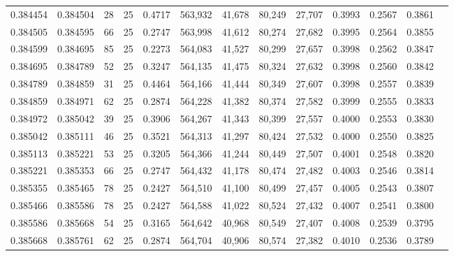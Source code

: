 \begin{tabular}{rrrrrrrrrrrrr}
0.384454 & 0.384504 &    28 &  25 &                                     0.4717 & 563,932 &  41,678 &  80,249 &  27,707 & 0.3993 & 0.2567 & 0.3861 \\
0.384505 & 0.384595 &    66 &  25 &                                     0.2747 & 563,998 &  41,612 &  80,274 &  27,682 & 0.3995 & 0.2564 & 0.3855 \\
0.384599 & 0.384695 &    85 &  25 &                                     0.2273 & 564,083 &  41,527 &  80,299 &  27,657 & 0.3998 & 0.2562 & 0.3847 \\
0.384695 & 0.384789 &    52 &  25 &                                     0.3247 & 564,135 &  41,475 &  80,324 &  27,632 & 0.3998 & 0.2560 & 0.3842 \\
0.384789 & 0.384859 &    31 &  25 &                                     0.4464 & 564,166 &  41,444 &  80,349 &  27,607 & 0.3998 & 0.2557 & 0.3839 \\
0.384859 & 0.384971 &    62 &  25 &                                     0.2874 & 564,228 &  41,382 &  80,374 &  27,582 & 0.3999 & 0.2555 & 0.3833 \\
0.384972 & 0.385042 &    39 &  25 &                                     0.3906 & 564,267 &  41,343 &  80,399 &  27,557 & 0.4000 & 0.2553 & 0.3830 \\
0.385042 & 0.385111 &    46 &  25 &                                     0.3521 & 564,313 &  41,297 &  80,424 &  27,532 & 0.4000 & 0.2550 & 0.3825 \\
0.385113 & 0.385221 &    53 &  25 &                                     0.3205 & 564,366 &  41,244 &  80,449 &  27,507 & 0.4001 & 0.2548 & 0.3820 \\
0.385221 & 0.385353 &    66 &  25 &                                     0.2747 & 564,432 &  41,178 &  80,474 &  27,482 & 0.4003 & 0.2546 & 0.3814 \\
0.385355 & 0.385465 &    78 &  25 &                                     0.2427 & 564,510 &  41,100 &  80,499 &  27,457 & 0.4005 & 0.2543 & 0.3807 \\
0.385466 & 0.385586 &    78 &  25 &                                     0.2427 & 564,588 &  41,022 &  80,524 &  27,432 & 0.4007 & 0.2541 & 0.3800 \\
0.385586 & 0.385668 &    54 &  25 &                                     0.3165 & 564,642 &  40,968 &  80,549 &  27,407 & 0.4008 & 0.2539 & 0.3795 \\
0.385668 & 0.385761 &    62 &  25 &                                     0.2874 & 564,704 &  40,906 &  80,574 &  27,382 & 0.4010 & 0.2536 & 0.3789 \\

\end{tabular}
